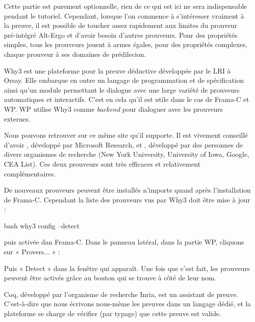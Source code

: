 

Cette partie est purement optionnelle, rien de ce qui est ici ne sera
indispensable pendant le tutoriel. Cependant, lorsque l'on commence à
s'intéresser vraiment à la preuve, il est possible de toucher assez rapidement
aux limites du prouveur pré-intégré Alt-Ergo et d'avoir besoin d'autres
prouveurs. Pour des propriétés simples, tous les prouveurs jouent à armes
égales, pour des propriétés complexes, chaque prouveur à ses domaines de
prédilecion.



Why3 est une plateforme pour la preuve déductive développée par le LRI à Orsay.
Elle embarque en outre un langage de programmation et de spécification ainsi
qu'un module permettant le dialogue avec une large variété de prouveurs
automatiques et interactifs. C'est en cela qu'il est utile dans le cas de
Frama-C et WP. WP utilise Why3 comme {\it backend} pour dialoguer avec les prouveurs
externes.


Nous pouvons retrouver sur ce même site
 qu'il supporte.
Il est vivement conseillé d'avoir ,
développé par Microsoft Research, et ,
développé par des personnes de divers organismes de recherche (New York
University, University of Iowa, Google, CEA List). Ces deux prouveurs sont très
efficaces et relativement complémentaires.


De nouveaux prouveurs peuvent être installés n'importe quand après
l'installation de Frama-C. Cependant la liste des prouveurs vus par Why3
doit être mise à jour :


\begin{CodeBlock}{bash}
why3 config --detect
\end{CodeBlock}


puis activée dan Frama-C. Dans le panneau latéral, dans la partie WP,
cliquons sur « Provers... » :




Puis « Detect » dans la fenêtre qui apparaît. Une fois que c'est fait,
les prouveurs peuvent être activés grâce au bouton qui se trouve à côté
de leur nom.






Coq, développé par l'organisme de recherche Inria, est un assistant de
preuve. C'est-à-dire que nous écrivons nous-même les preuves dans un
langage dédié, et la plateforme se charge de vérifier (par typage) que
cette preuve est valide.



